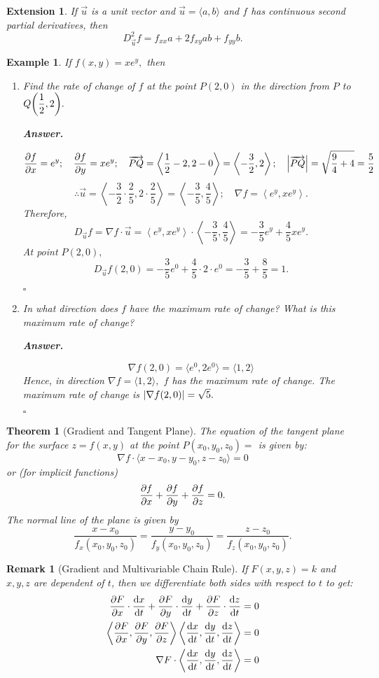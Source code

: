 \documentclass[12pt,a4paper]{article}
\newtheorem{thm}{Theorem}[subsection]
\newtheorem{eg}{Example}[subsection]
\newenvironment*{ans}{\par\indent\textbf{\textit{Answer. }}\par}{\par\hfill{$\square$}\par}
\newtheorem*{rmk}{\indent Remark}
\newtheorem*{ext}{\indent Extension}
\def\vecu{\vec{u}}
\begin{document}
\begin{ext}
	If $\vecu$ is a unit vector and $\vecu=\langle a,b\rangle$ and $f$ has continuous second partial derivatives, then \[D_{\vecu}^2f=f_{xx}a+2f_{xy}ab+f_{yy}b.\]	
\end{ext}
\begin{eg}
	If $f(x,y)=xe^y,$ then
	\begin{enumerate}
		\item Find the rate of change of $f$ at the point $P(2,0)$ in the direction from $P$ to $Q\qty(\dfrac{1}{2},2).$
		\begin{ans}
			\[\pdv{f}{x}=e^y;\quad\pdv{f}{y}=xe^y;\quad\overrightarrow{PQ}=\left\langle\frac{1}{2}-2,2-0\right\rangle=\left\langle-\frac{3}{2},2\right\rangle;\quad\qty|\overrightarrow{PQ}|=\sqrt{\frac{9}{4}+4}=\frac{5}{2}\]\[\therefore\vecu=\left\langle-\frac{3}{2}\cdot\frac{2}{5},2\cdot\frac{2}{5}\right\rangle=\left\langle-\frac{3}{5},\frac{4}{5}\right\rangle;\quad\nabla f=\left\langle e^y,xe^y\right\rangle.\]Therefore, \[D_{\vecu}f=\nabla f\cdot\vecu=\left\langle e^y,xe^y\right\rangle\cdot\left\langle-\frac{3}{5},\frac{4}{5}\right\rangle=-\frac{3}{5}e^y+\frac{4}{5}xe^y.\] At point $P(2,0),$ \[D_{\vecu}f(2,0)=-\frac{3}{5}e^0+\frac{4}{5}\cdot2\cdot e^0=-\frac{3}{5}+\frac{8}{5}=1.\]
		\end{ans}
		\item In what direction does $f$ have the maximum rate of change? What is this maximum rate of change?
		\begin{ans}
			\[\nabla f(2,0)=\langle e^0,2e^0\rangle=\langle1,2\rangle\] Hence, in direction $\nabla f=\langle1,2\rangle,$ $f$ has the maximum rate of change. The maximum rate of change is $\qty|\nabla f(2,0)|=\sqrt{5}.$
		\end{ans}
	\end{enumerate}
\end{eg}
\begin{thm}[Gradient and Tangent Plane]
	The equation of the tangent plane for the surface $z=f(x,y)$ at the point $P(x_0,y_0,z_0) =$ is given by: \[\nabla f\cdot\langle x-x_0,y-y_0,z-z_0\rangle=0\] or (for implicit functions) \[\pdv{f}{x} (x-x_0)+\pdv{f}{y} (y-y_0)+\pdv{f}{z} (z-z_0)=0.\]	The normal line of the plane is given by \[\frac{x-x_0}{f_x(x_0,y_0,z_0)}=\frac{y-y_0}{f_y(x_0,y_0,z_0)}=\frac{z-z_0}{f_z(x_0,y_0,z_0)}.\]
\end{thm}
\begin{rmk}[Gradient and Multivariable Chain Rule]
	If $F(x,y,z)=k$ and $x,y,z$ are dependent of $t$, then we differentiate both sides with respect to $t$ to get:\[\begin{aligned}\pdv{F}{x}\cdot\dv{x}{t}+\pdv{F}{y}\cdot\dv{y}{t}+\pdv{F}{z}\cdot\dv{z}{t}&=0\\\left\langle\pdv{F}{x},\pdv{F}{y},\pdv{F}{z}\right\rangle\left\langle\dv{x}{t},\dv{y}{t},\dv{z}{t}\right\rangle&=0\\\nabla F\cdot\left\langle\dv{x}{t},\dv{y}{t},\dv{z}{t}\right\rangle&=0\end{aligned}\]	
\end{rmk}
\end{document}
